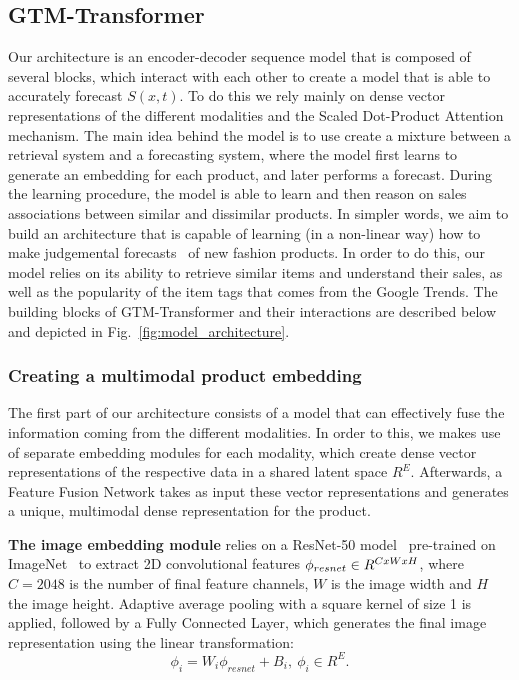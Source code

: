 \documentclass{article}
\newcommand{\approachname}[0] {GTM-Transformer\xspace}
\begin{document}
\subsection{\approachname{}}
Our architecture is an encoder-decoder sequence model \cite{sutskever2014} that is composed of several blocks, which interact with each other to create a model that is able to accurately forecast $S(x,t)$. To do this we rely mainly on dense vector representations of the different modalities and the Scaled Dot-Product Attention mechanism. The main idea behind the model is to use create a mixture between a retrieval system and a forecasting system, where the model first learns to generate an embedding for each product, and later performs a forecast. During the learning procedure, the model is able to learn and then reason on sales associations between similar and dissimilar products. In simpler words, we aim to build an architecture that is capable of learning (in a non-linear way) how to make judgemental forecasts~\cite{FPAP2} of new fashion products. In order to do this, our model relies on its ability to retrieve similar items and understand their sales, as well as the popularity of the item tags that comes from the Google Trends.  The building blocks of \approachname{} and their interactions are described below and depicted in Fig.~\ref{fig:model_architecture}.

\subsubsection{Creating a multimodal product embedding}
The first part of our architecture consists of a model that can effectively fuse the information coming from the different modalities. In order to this, we makes use of separate embedding modules for each modality, which create dense vector representations of the respective data in a shared latent space $R^E$. Afterwards, a Feature Fusion Network takes as input these vector representations and generates a unique, multimodal dense representation for the product. 

\textbf{The image embedding module} relies on a ResNet-50 model~\cite{he2015deep} pre-trained on ImageNet~\cite{imagenet} to extract 2D convolutional features $\phi_{resnet} \in \\R^{CxWxH}$, where $C=2048$ is the number of final feature channels, $W$ is the image width and $H$ the image height. Adaptive average pooling \cite{Liu_2018_CVPR} with a square kernel of size 1 is applied, followed by a Fully Connected Layer, which generates the final image representation using the linear transformation: 
\begin{equation}\label{eq:6}
    \phi_i = W_i \phi_{resnet}  + B_i,\: \phi_i \in R^E.
\end{equation}
\end{document}

